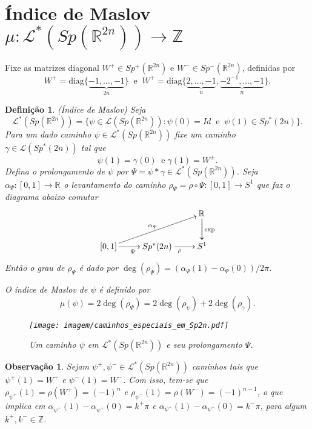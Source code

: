 \documentclass[12pt]{book}
\newtheorem{definicao}[teorema]{Definição}
\newtheorem{observacao}[teorema]{Observação}
\newcommand{\caminhosespeciais}[1]{\mathcal{L}^{*}(#1)}
\newcommand{\caminhos}{\mathcal{L}}
\newcommand{\circulo}{S^{1}}
\newcommand{\diag}{\text{diag}}
\newcommand{\dominioMaslov}{\caminhos^{*}(\gruposimpletico{\real{2n}})}
\newcommand{\gruposimpletico}[1]{Sp(#1)}
\newcommand{\gruposimpleticonaodegenerado}[1]{Sp^{#1}(2n)}
\newcommand{\gruposimpleticomais}[1]{Sp^{+}(#1)}
\newcommand{\gruposimpleticomenos}[1]{Sp^{-}(#1)}
\newcommand{\inteiros}{\mathbb{Z}}
\newcommand{\intervalo}{[0,1]}
\newcommand{\real}[1]{\mathbb{R}^{#1}}
\newcommand{\reta}{\real{}}
\begin{document}
	
	\section{Índice de Maslov $\mu : \dominioMaslov \to \inteiros$}\label{secao_indice_maslov}
	
	Fixe as matrizes diagonal $W^{+}\in \gruposimpleticomais{\real{2n}}$ e $W^{-}\in \gruposimpleticomenos{\real{2n}}$, definidas por
	$$
	W^{+}=\diag\{\underbrace{-1,\dots, -1}_{2n} \} \;\; \text{e}\;\;W^{+}=\diag\{\underbrace{2,\dots, -1}_{n},\underbrace{-2^{-1},\dots, -1}_{n} \} .
	$$
	
	\begin{definicao}
		(Índice de Maslov) 
		Seja 
		$$
		\dominioMaslov=\{ \psi \in \caminhos(\gruposimpletico{\real{2n}}): \psi(0)=Id \;\; \text{e}\;\; \psi(1)\in \gruposimpleticonaodegenerado{*}\}.
		$$
		Para um dado caminho $\psi \in \dominioMaslov$ fixe um caminho $\gamma \in \caminhos(\gruposimpleticonaodegenerado{*})$ tal que 
		$$
		\psi(1)=\gamma(0)\;\;\text{e}\;\gamma(1)=W^{\pm}.
		$$
		Defina o prolongamento de $\psi$ por $\Psi = \psi*\gamma \in   \dominioMaslov$. Seja $\alpha_{\Psi}: \intervalo \to \reta$ o levantamento do caminho $\rho_{\Psi} = \rho \circ \Psi:\intervalo\to \circulo$ que faz o diagrama abaixo comutar
		$$
		\xymatrix{
			& & \real{}\ar[d]\ar[d]^{\text{exp}}
			\\
			[0,1 ]\ar[urr]^{\alpha_{\Psi}} \ar[r]_{\Psi} & \gruposimpleticonaodegenerado{*} \ar[r]_{\rho} & S^{1}
		}
		$$	
		Então o grau de $\rho_{\Psi}$ é dado por $\deg(\rho_{\Psi}) = (\alpha_{\Psi}(1)-\alpha_{\Psi}(0))/2\pi$. 
		
		O índice de Maslov de $\psi$ é definido por
		$$
		\mu(\psi)= 2\deg(\rho_{\Psi}) = 2\deg(\rho_{\psi}) + 2\deg(\rho_{\gamma}).
		$$
		
		\begin{figure}[!h]
			\centering
			\texttt{[image: imagem/caminhos\_especiais\_em\_Sp2n.pdf]}
			\caption{Um caminho $\psi$ em $\caminhosespeciais{\gruposimpletico{\real{2n}}}$ e seu prolongamento $\Psi$.}
		\end{figure}
	\end{definicao}
	
	\begin{observacao}
		Sejam $\psi^{+}, \psi^{-} \in  \caminhosespeciais{\gruposimpletico{\real{2n}}}$ caminhos tais que $\psi^{+}(1)=W^{+}$ e $\psi^{-}(1)=W^{-}$. Com isso, tem-se que $\rho_{\psi^{+}}(1) =\rho(W^{+}) = (-1)^{n}$ e $\rho_{\psi^{-}}(1) =\rho(W^{-}) = (-1)^{n-1}$, o que implica em $\alpha_{\psi^{+}}(1)-\alpha_{\psi^{+}}(0) = k^{+}\pi$ e $\alpha_{\psi^{-}}(1)-\alpha_{\psi^{-}}(0) = k^{-}\pi$, para algum $k^{+}, k^{-}\in \inteiros$.
	\end{observacao}
	
\end{document}
